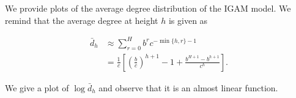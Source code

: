 \documentclass[11pt]{article}
\begin{document}
We provide plots of the average degree distribution of the IGAM model.
We remind that the average degree at height \(h\) is given as

\begin{equation*}
\begin{split}
    \bar d_h & \approx \sum_{r = 0}^H b^r c^{-\min \{ h, r \} - 1} \\
    & =  \frac 1 c \left [ \left ( \frac b c \right )^{h + 1} - 1 + \frac {b^{H + 1} - b^{h + 1}} {c^h} \right ] . 
\end{split}
\end{equation*}

We give a plot of \(\log \bar d_h\) and observe that it is an almost
linear function.
\end{document}
